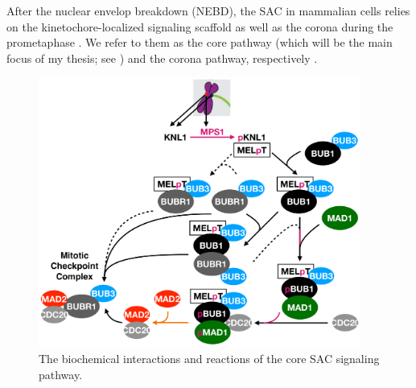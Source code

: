 After the nuclear envelop breakdown (NEBD), the SAC in mammalian cells relies on the kinetochore-localized signaling scaffold  as well as the corona during the prometaphase \cite{GSK923295LateralAttachmentEM, LateralAttachmentSAC, CoronaActivatesSAC}. We refer to them as the core pathway (which will be the main focus of my thesis; see ) and the corona pathway, respectively \cite{RZZ-MAD1vsBUB1-MAD1_2015, eSAC}.

\begin{figure}
    \centering
    \includegraphics[width=0.94\textwidth]{chapters/figures/CoreSAC.pdf}
    \caption{The biochemical interactions and reactions of the core SAC signaling pathway.}

\end{figure}
